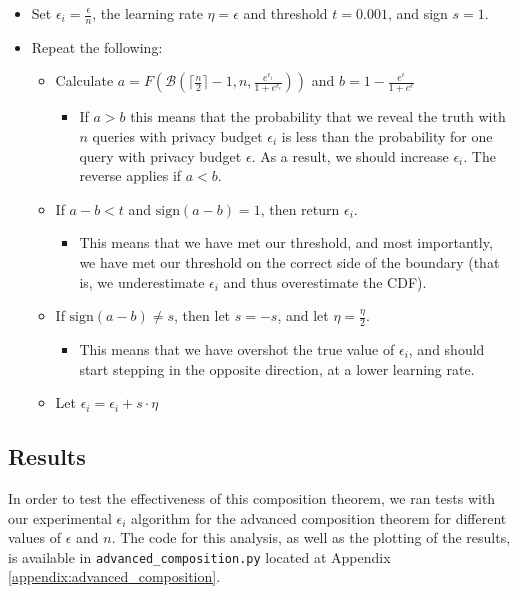 \documentclass[12pt]{article}
\theoremstyle{definition}
\def\cl{\lstinline}
\begin{document}
\begin{itemize}
    \item Set $\epsilon_i = \frac{\epsilon}{n}$, the learning rate $\eta = \epsilon$ and threshold $t = 0.001$, and sign $s = 1$.
    \item Repeat the following:
    \begin{itemize}
        \item Calculate $a = F(\mathcal{B}(\lceil \frac{n}{2} \rceil - 1, n, \frac{e^{\epsilon_i}}{1 + e^{\epsilon_i}}))$ and $b = 1 - \frac{e^\epsilon}{1 + e^\epsilon}$
        \begin{itemize}
            \item If $a > b$ this means that the probability that we reveal the truth with $n$ queries with privacy budget $\epsilon_i$ is less than the probability for one query with privacy budget $\epsilon$. As a result, we should increase $\epsilon_i$. The reverse applies if $a < b$.
        \end{itemize}
        \item If $a - b < t$ and $\text{sign}(a - b) = 1$, then return $\epsilon_i$.
        \begin{itemize}
            \item This means that we have met our threshold, and most importantly, we have met our threshold on the correct side of the boundary (that is, we underestimate $\epsilon_i$ and thus overestimate the CDF).
        \end{itemize}
        \item If $\text{sign}(a - b) \neq s$, then let $s = -s$, and let $\eta = \frac{\eta}{2}$.
        \begin{itemize}
            \item This means that we have overshot the true value of $\epsilon_i$, and should start stepping in the opposite direction, at a lower learning rate.
        \end{itemize}
        \item Let $\epsilon_i = \epsilon_i + s \cdot \eta$
    \end{itemize}
\end{itemize}

\subsection{Results}

\noindent

In order to test the effectiveness of this composition theorem, we ran tests with our experimental $\epsilon_i$ algorithm for the advanced composition theorem for different values of $\epsilon$ and $n$. The code for this analysis, as well as the plotting of the results, is available in \cl{advanced_composition.py} located at Appendix \ref{appendix:advanced_composition}.
\end{document}
